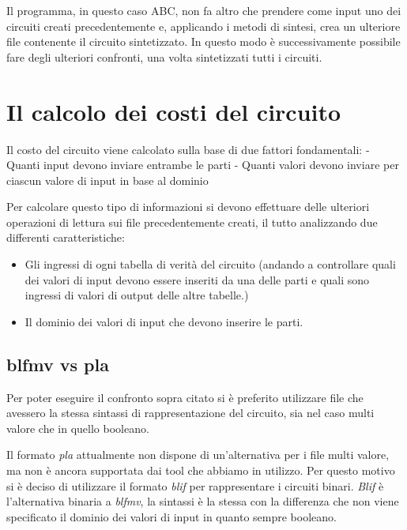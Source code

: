 \documentclass[]{book}
\providecommand{\tightlist}{%
  \setlength{\itemsep}{0pt}\setlength{\parskip}{0pt}}
\begin{document}
Il programma, in questo caso ABC, non fa altro che prendere come input uno dei circuiti creati precedentemente e, applicando i metodi di sintesi, crea un ulteriore file contenente il circuito sintetizzato. In questo modo è successivamente possibile fare degli ulteriori confronti, una volta sintetizzati tutti i circuiti.

\hypertarget{il-calcolo-dei-costi-del-circuito}{%
\section{Il calcolo dei costi del circuito}\label{il-calcolo-dei-costi-del-circuito}}

Il costo del circuito viene calcolato sulla base di due fattori fondamentali:
- Quanti input devono inviare entrambe le parti
- Quanti valori devono inviare per ciascun valore di input in base al dominio

Per calcolare questo tipo di informazioni si devono effettuare delle ulteriori operazioni di lettura sui file precedentemente creati, il tutto analizzando due differenti caratteristiche:

\begin{itemize}
\tightlist
\item
  Gli ingressi di ogni tabella di verità del circuito (andando a controllare quali dei valori di input devono essere inseriti da una delle parti e quali sono ingressi di valori di output delle altre tabelle.)
\item
  Il dominio dei valori di input che devono inserire le parti.
\end{itemize}

\newpage

\hypertarget{blfmv-vs-pla}{%
\subsection{blfmv vs pla}\label{blfmv-vs-pla}}

Per poter eseguire il confronto sopra citato si è preferito utilizzare file che avessero la stessa sintassi di rappresentazione del circuito, sia nel caso multi valore che in quello booleano.

Il formato \emph{pla} attualmente non dispone di un'alternativa per i file multi valore, ma non è ancora supportata dai tool che abbiamo in utilizzo. Per questo motivo si è deciso di utilizzare il formato \emph{blif} per rappresentare i circuiti binari. \emph{Blif} è l'alternativa binaria a \emph{blfmv}, la sintassi è la stessa con la differenza che non viene specificato il dominio dei valori di input in quanto sempre booleano.
\end{document}
